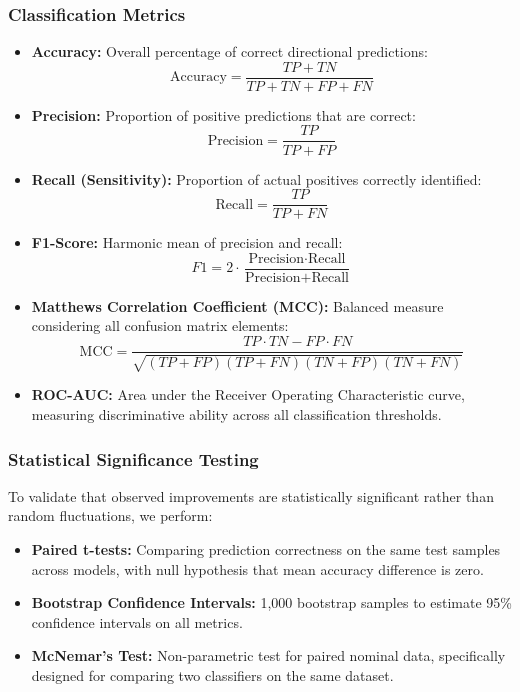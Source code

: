 \documentclass[conference]{IEEEtran}
\begin{document}
\subsubsection{Classification Metrics}
\begin{itemize}
\item \textbf{Accuracy:} Overall percentage of correct directional predictions: 
\begin{equation}
\text{Accuracy} = \frac{TP + TN}{TP + TN + FP + FN}
\end{equation}

\item \textbf{Precision:} Proportion of positive predictions that are correct:
\begin{equation}
\text{Precision} = \frac{TP}{TP + FP}
\end{equation}

\item \textbf{Recall (Sensitivity):} Proportion of actual positives correctly identified:
\begin{equation}
\text{Recall} = \frac{TP}{TP + FN}
\end{equation}

\item \textbf{F1-Score:} Harmonic mean of precision and recall:
\begin{equation}
F1 = 2 \cdot \frac{\text{Precision} \cdot \text{Recall}}{\text{Precision} + \text{Recall}}
\end{equation}

\item \textbf{Matthews Correlation Coefficient (MCC):} Balanced measure considering all confusion matrix elements:
\begin{equation}
\text{MCC} = \frac{TP \cdot TN - FP \cdot FN}{\sqrt{(TP+FP)(TP+FN)(TN+FP)(TN+FN)}}
\end{equation}

\item \textbf{ROC-AUC:} Area under the Receiver Operating Characteristic curve, measuring discriminative ability across all classification thresholds.
\end{itemize}

\subsubsection{Statistical Significance Testing}
To validate that observed improvements are statistically significant rather than random fluctuations, we perform:

\begin{itemize}
\item \textbf{Paired t-tests:} Comparing prediction correctness on the same test samples across models, with null hypothesis that mean accuracy difference is zero.

\item \textbf{Bootstrap Confidence Intervals:} 1,000 bootstrap samples to estimate 95\% confidence intervals on all metrics.

\item \textbf{McNemar's Test:} Non-parametric test for paired nominal data, specifically designed for comparing two classifiers on the same dataset.
\end{itemize}
\end{document}
